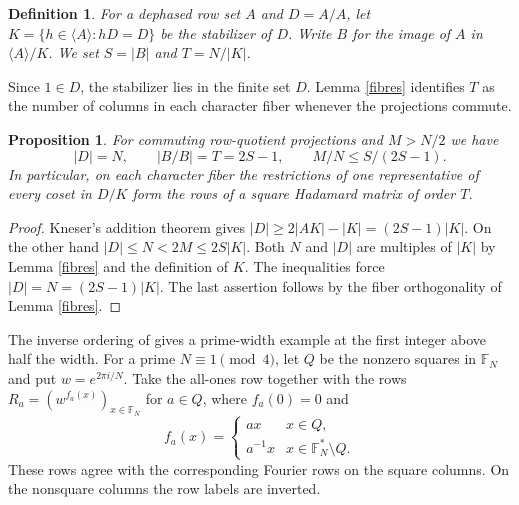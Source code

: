 \documentclass[11pt,a4paper]{article}
\newtheorem{prop}[thm]{Proposition}
\newtheorem{defn}[thm]{Definition}
\begin{document}
\begin{defn}
For a dephased row set $A$ and $D=A/A$, let $K=\{h\in\langle A\rangle:hD=D\}$ be the stabilizer of $D$. Write $B$ for the image of $A$ in $\langle A\rangle/K$. We set $S=|B|$ and $T=N/|K|$.
\end{defn}

Since $1\in D$, the stabilizer lies in the finite set $D$. Lemma \ref{fibres} identifies $T$ as the number of columns in each character fiber whenever the projections commute.

\begin{prop}\label{reduce}
For commuting row-quotient projections and $M>N/2$ we have
\[
 |D|=N,\qquad |B/B|=T=2S-1,\qquad M/N\leq S/(2S-1).
\]
In particular, on each character fiber the restrictions of one representative of every coset in $D/K$ form the rows of a square Hadamard matrix of order $T$.
\end{prop}
\begin{proof}
Kneser's addition theorem \cite{hou,kneser} gives $|D|\geq 2|AK|-|K|=(2S-1)|K|$. On the other hand $|D|\leq N<2M\leq 2S|K|$. Both $N$ and $|D|$ are multiples of $|K|$ by Lemma \ref{fibres} and the definition of $K$. The inequalities force $|D|=N=(2S-1)|K|$. The last assertion follows by the fiber orthogonality of Lemma \ref{fibres}.
\end{proof}

The inverse ordering of \cite{prime} gives a prime-width example at the first integer above half the width. For a prime $N\equiv1\pmod4$, let $Q$ be the nonzero squares in $\mathbb F_N$ and put $w=e^{2\pi i/N}$. Take the all-ones row together with the rows $R_a=(w^{f_a(x)})_{x\in\mathbb F_N}$ for $a\in Q$, where $f_a(0)=0$ and
\[
 f_a(x)=
 \begin{cases}
 ax & x\in Q,\\
 a^{-1}x & x\in\mathbb F_N^*\setminus Q.
 \end{cases}
\]
These rows agree with the corresponding Fourier rows on the square columns. On the nonsquare columns the row labels are inverted.
\end{document}
